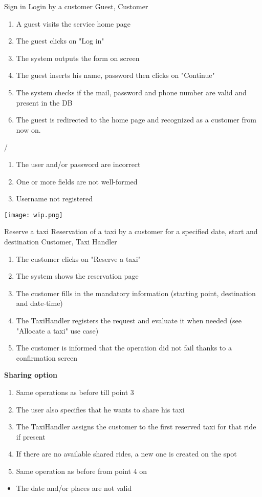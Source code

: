 \usecase
{Sign in}
{Login by a customer}
{Guest, Customer}
{
\begin{enumerate}
	\item A guest visits the service home page
	\item The guest clicks on "Log in"
	\item The system outputs the form on screen
	\item The guest inserts his name, password then clicks on "Continue"
	\item The system checks if the mail, password and phone number are valid and present in the DB
	\item The guest is redirected to the home page and recognized as a customer from now on.
\end{enumerate}
}
{
/
}
{ \begin{enumerate}
	\item The user and/or password are incorrect
	\item One or more fields are not well-formed
	\item Username not registered
\end{enumerate} }

\pagebreak
\texttt{[image: wip.png]}

\usecase
{Reserve a taxi}
{Reservation of a taxi by a customer for a specified date, start and destination}
{Customer, Taxi Handler}
{
\begin{enumerate}
	\item The customer clicks on "Reserve a taxi"
	\item The system shows the reservation page
	\item The customer fills in the mandatory information (starting point, destination and date-time)
	\item The TaxiHandler registers the request and evaluate it when needed (see "Allocate a taxi" use case)
	\item The customer is informed that the operation did not fail thanks to a confirmation screen
\end{enumerate}
}
{
\textbf{Sharing option}
\begin{enumerate}
	\item Same operations as before till point 3
	\item The user also specifies that he wants to share his taxi
	\item The TaxiHandler assigns the customer to the first reserved taxi for that ride if present
	\item If there are no available shared rides, a new one is created on the spot
	\item Same operation as before from point 4 on
\end{enumerate}
}
{ 
\begin{itemize}
\item The date and/or places are not valid
\end{itemize}
}

